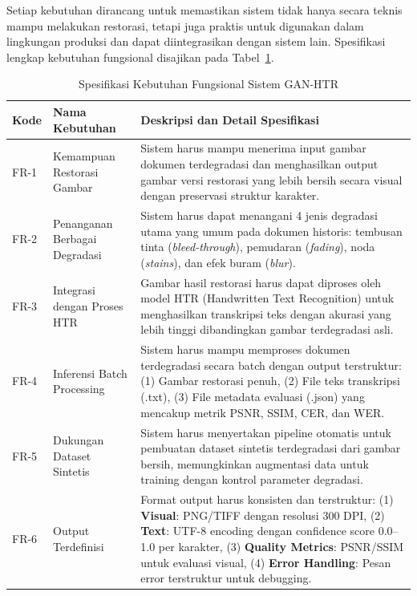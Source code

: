 Setiap kebutuhan dirancang untuk memastikan sistem tidak hanya secara teknis mampu melakukan restorasi, tetapi juga praktis untuk digunakan dalam lingkungan produksi dan dapat diintegrasikan dengan sistem lain. Spesifikasi lengkap kebutuhan fungsional disajikan pada Tabel~\ref{tab:functional_requirements}.

\begin{table}[htbp!]
\centering
\small
\caption{Spesifikasi Kebutuhan Fungsional Sistem GAN-HTR}
\label{tab:functional_requirements}
\begin{tabular}{p{}p{}p{}}
\toprule
\textbf{Kode} & \textbf{Nama Kebutuhan} & \textbf{Deskripsi dan Detail Spesifikasi} \\
\midrule
FR-1 & Kemampuan Restorasi Gambar & Sistem harus mampu menerima input gambar dokumen terdegradasi dan menghasilkan output gambar versi restorasi yang lebih bersih secara visual dengan preservasi struktur karakter. \\
\midrule
FR-2 & Penanganan Berbagai Degradasi & Sistem harus dapat menangani 4 jenis degradasi utama yang umum pada dokumen historis: tembusan tinta (\textit{bleed-through}), pemudaran (\textit{fading}), noda (\textit{stains}), dan efek buram (\textit{blur}). \\
\midrule
FR-3 & Integrasi dengan Proses HTR & Gambar hasil restorasi harus dapat diproses oleh model HTR (Handwritten Text Recognition) untuk menghasilkan transkripsi teks dengan akurasi yang lebih tinggi dibandingkan gambar terdegradasi asli. \\
\midrule
FR-4 & Inferensi Batch Processing & Sistem harus mampu memproses dokumen terdegradasi secara batch dengan output terstruktur: (1) Gambar restorasi penuh, (2) File teks transkripsi (.txt), (3) File metadata evaluasi (.json) yang mencakup metrik PSNR, SSIM, CER, dan WER. \\
\midrule
FR-5 & Dukungan Dataset Sintetis & Sistem harus menyertakan pipeline otomatis untuk pembuatan dataset sintetis terdegradasi dari gambar bersih, memungkinkan augmentasi data untuk training dengan kontrol parameter degradasi. \\
\midrule
FR-6 & Output Terdefinisi & Format output harus konsisten dan terstruktur: (1) \textbf{Visual}: PNG/TIFF dengan resolusi 300 DPI, (2) \textbf{Text}: UTF-8 encoding dengan confidence score 0.0--1.0 per karakter, (3) \textbf{Quality Metrics}: PSNR/SSIM untuk evaluasi visual, (4) \textbf{Error Handling}: Pesan error terstruktur untuk debugging. \\

\end{tabular}
\end{table}
